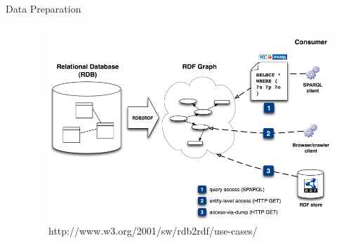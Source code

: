 \documentclass{beamer}
\begin{document}
\begin{frame}{Data Preparation}
\begin{columns}
\begin{column}{.3\textwidth}
\end{column}%
\hfill%
\begin{column}{.66\textwidth}
\begin{figure}
\includegraphics[width=\textwidth,height=.88\textheight,keepaspectratio]{rdb2rdf}
{\footnotesize \caption{http://www.w3.org/2001/sw/rdb2rdf/use-cases/}}
\end{figure}
\end{column}%
\end{columns}
\end{frame}
\end{document}
